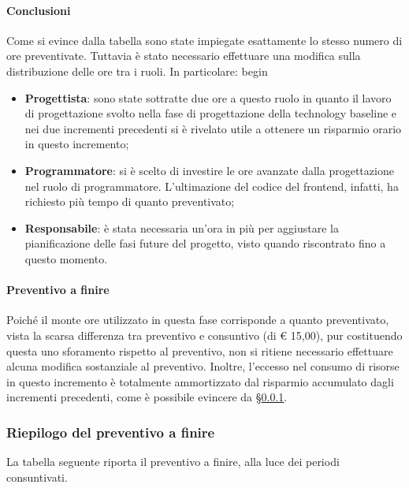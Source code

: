 \paragraph{Conclusioni}
Come si evince dalla tabella sono state impiegate esattamente lo stesso numero di ore preventivate. Tuttavia è stato necessario effettuare una modifica sulla distribuzione delle ore tra i ruoli. In particolare:
begin\begin{itemize}
	\item \textbf{Progettista}: sono state sottratte due ore a questo ruolo in quanto il lavoro di progettazione svolto nella fase di progettazione della technology baseline e nei due incrementi precedenti si è rivelato utile a ottenere un risparmio orario in questo incremento;
	\item \textbf{Programmatore}: si è scelto di investire le ore avanzate dalla progettazione nel ruolo di programmatore. L'ultimazione del codice del frontend, infatti, ha richiesto più tempo di quanto preventivato;
	\item \textbf{Responsabile}: è stata necessaria un'ora in più per aggiustare la pianificazione delle fasi future del progetto, visto quando riscontrato fino a questo momento.
\end{itemize} 

\paragraph{Preventivo a finire}
Poiché il monte ore utilizzato in questa fase corrisponde a quanto preventivato, vista la scarsa differenza tra preventivo e consuntivo (di € 15,00), pur costituendo questa uno sforamento rispetto al preventivo, non si ritiene necessario effettuare alcuna modifica sostanziale al preventivo. Inoltre, l'eccesso nel consumo di risorse in questo incremento è totalmente ammortizzato dal risparmio accumulato dagli incrementi precedenti, come è possibile evincere da \S\ref{riepilogoPAF}.

\subsubsection{Riepilogo del preventivo a finire}\label{riepilogoPAF}

La tabella seguente riporta il preventivo a finire, alla luce dei periodi consuntivati.

